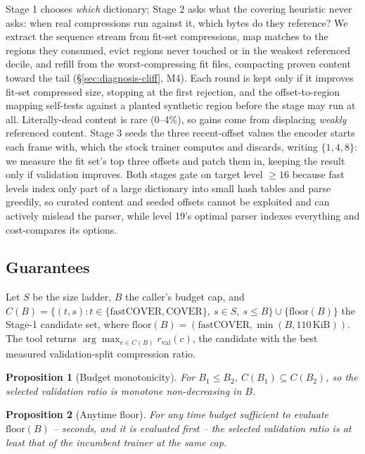 \documentclass[12pt]{article}
\newtheorem{proposition}{Proposition}
\begin{document}
Stage 1 chooses \emph{which} dictionary; Stage 2 asks what the covering
heuristic never asks: when real compressions run against it, which
bytes do they reference? We extract the sequence stream from fit-set
compressions, map matches to the regions they consumed, evict regions
never touched or in the weakest referenced decile, and refill from the
worst-compressing fit files, compacting proven content toward the tail
(\S\ref{sec:diagnosis-cliff}, M4). Each round is kept only if it
improves fit-set compressed size, stopping at the first rejection, and
the offset-to-region mapping self-tests against a planted synthetic
region before the stage may run at all. Literally-dead content is rare
(0--4\%), so gains come from displacing \emph{weakly} referenced
content. Stage 3 seeds the three recent-offset values the encoder
starts each frame with, which the stock trainer computes and discards,
writing $\{1,4,8\}$: we measure the fit set's top three offsets and
patch them in, keeping the result only if validation improves. Both
stages gate on target level $\ge 16$ because fast levels index only
part of a large dictionary into small hash tables and parse greedily,
so curated content and seeded offsets cannot be exploited and can
actively mislead the parser, while level 19's optimal parser indexes
everything and cost-compares its options.

\subsection{Guarantees}
\label{sec:design-guarantees}

\begin{sloppypar}
Let $S$ be the size ladder, $B$ the caller's budget cap, and
$C(B) = \{(t,s) : t \in \{\text{fastCOVER}, \text{COVER}\},\ s \in S,\ s
\le B\} \cup \{\text{floor}(B)\}$ the Stage-1 candidate set, where
$\text{floor}(B) = (\text{fastCOVER}, \min(B, 110\,\text{KiB}))$. The
tool returns $\arg\max_{c \in C(B)} r_{\text{val}}(c)$, the candidate
with the best measured validation-split compression ratio.
\end{sloppypar}

\begin{proposition}[Budget monotonicity]
\label{prop:budget-monotonicity}
For $B_1 \le B_2$, $C(B_1) \subseteq C(B_2)$, so the selected validation
ratio is monotone non-decreasing in $B$.
\end{proposition}

\begin{proposition}[Anytime floor]
\label{prop:anytime-floor}
For any time budget sufficient to evaluate $\text{floor}(B)$ -- seconds,
and it is evaluated first -- the selected validation ratio is at least
that of the incumbent trainer at the same cap.
\end{proposition}
\end{document}
